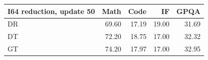\begin{tabular}{lrrrr}
\toprule
I64 reduction, update 50 & Math & Code & IF & GPQA \\
\midrule
DR & 69.60 & 17.19 & 19.00 & 31.69 \\
DT & 72.20 & 18.75 & 17.00 & 32.32 \\
GT & 74.20 & 17.97 & 17.00 & 32.95 \\
\bottomrule
\end{tabular}
